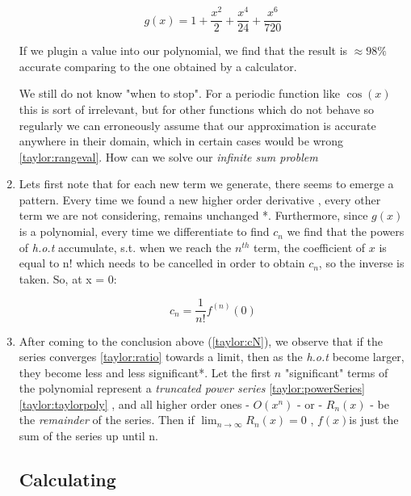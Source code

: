 \documentclass[english,course]{Notes}
\newcommand{\ita}[1]{\textit{#1}}
\begin{document}
\begin{enumerate}
$$ g(x) = 1 + \frac{x^2}{2} + \frac{x^4}{24} + \frac{x^6}{720} $$

If we plugin a value into our polynomial, we find that the result is $\approx 98\%$ accurate comparing to the one obtained by a calculator. 

We still do not know "when to stop". For a periodic function like $\cos(x)$ this is sort of irrelevant, but for other functions which do not behave so regularly we can erroneously assume that our approximation is accurate anywhere in their domain, which in certain cases would be wrong \ref{taylor:rangeval}. How can we solve our \ita{infinite sum problem}

\item Lets first note that for each new term we generate, there seems to emerge a pattern. Every time we found a new higher order derivative , every other term we are not considering, remains unchanged *.  Furthermore, since $g(x)$ is a polynomial, every time we differentiate to find $c_n$ we find that the powers of \ita{h.o.t} accumulate, s.t. when we reach the $n^{th}$ term, the coefficient of $x$ is equal to n! which needs to be cancelled in order to obtain $c_n$, so the inverse is taken. So, at x = 0:

$$ c_n = \frac{1}{n!}f^{(n)}(0) \label{taylor:cN} $$


\item {}After coming to the conclusion above (\ref{taylor:cN}), we observe that if the series converges \ref{taylor:ratio} towards a limit, then as the \ita{h.o.t} become larger, they become less and less significant*. Let the first $n$ "significant" terms of the polynomial represent a \ita{truncated power series} \ref{taylor:powerSeries} \ref{taylor:taylorpoly} , and all higher order ones - $O(x^n)$ - or - $R_n(x)$ - be the \ita{remainder} of the series. Then if $ \lim_{n\to\infty}R_n(x) = 0$ , $f(x)$is just the sum of the series up until n.

\newpage
\subsection{Calculating}


\end{enumerate}
\end{document}
